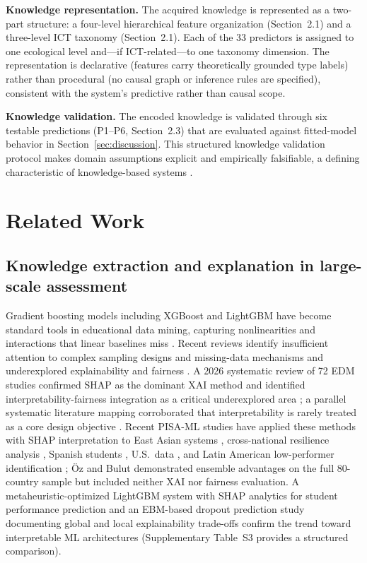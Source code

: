 \documentclass[review,12pt]{elsarticle}
\begin{document}
\textbf{Knowledge representation.} The acquired knowledge is represented as a two-part structure: a four-level hierarchical feature organization (Section~2.1) and a three-level ICT taxonomy (Section~2.1). Each of the 33 predictors is assigned to one ecological level and---if ICT-related---to one taxonomy dimension. The representation is declarative (features carry theoretically grounded type labels) rather than procedural (no causal graph or inference rules are specified), consistent with the system's predictive rather than causal scope.

\textbf{Knowledge validation.} The encoded knowledge is validated through six testable predictions (P1--P6, Section~2.3) that are evaluated against fitted-model behavior in Section~\ref{sec:discussion}. This structured knowledge validation protocol makes domain assumptions explicit and empirically falsifiable, a defining characteristic of knowledge-based systems \citep{Pham_2025_FAIREDU,Yang_2025_LLM_KBS}.\

\section{Related Work}

\subsection{Knowledge extraction and explanation in large-scale assessment}

Gradient boosting models including XGBoost and LightGBM have become standard tools in educational data mining, capturing nonlinearities and interactions that linear baselines miss \citep{Chen_Guestrin_2016,Ke_2017,Hastie_Tibshirani_Friedman_2009}. Recent reviews identify insufficient attention to complex sampling designs and missing-data mechanisms \citep{Ersozlu_2024} and underexplored explainability and fairness \citep{Wang_2024_AIED_review}. A 2026 systematic review of 72 EDM studies confirmed SHAP as the dominant XAI method and identified interpretability-fairness integration as a critical underexplored area \citep{CAEAI_2026_review}; a parallel systematic literature mapping corroborated that interpretability is rarely treated as a core design objective \citep{Carvalho_2026_SLM}. Recent PISA-ML studies have applied these methods with SHAP interpretation to East Asian systems \citep{Huang_2024}, cross-national resilience analysis \citep{Cheung_2024_resilience}, Spanish students \citep{Gomez_Talal_2025}, U.S.\ data \citep{Zhu_2025_US_PISA}, and Latin American low-performer identification \citep{PISA_2022_XAI_low_performers,PISA_2022_XAI_resilience}; \mbox{\"Oz} and Bulut \citep{Oz_2025_stacking} demonstrated ensemble advantages on the full 80-country sample but included neither XAI nor fairness evaluation. A metaheuristic-optimized LightGBM system with SHAP analytics for student performance prediction \citep{Yildirim_2025_ESWA_LightGBM} and an EBM-based dropout prediction study documenting global and local explainability trade-offs \citep{Camargos_2025_EBM_dropout} confirm the trend toward interpretable ML architectures (Supplementary Table~S3 provides a structured comparison).
\end{document}
